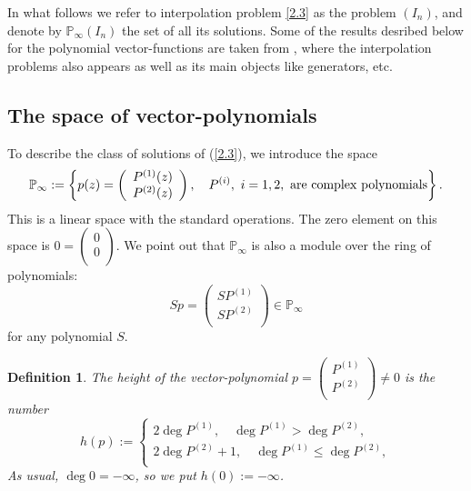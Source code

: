 \documentclass{amsart}
\newtheorem{definition}[theorem]{Definition}
\begin{document}
In what follows we refer to interpolation problem \eqref{2.3} as the
problem $(I_n)$, and denote by ${{\mathbb P}}_\infty(I_n)$ the set of all its
solutions. Some of the results desribed below for the polynomial
vector-functions are taken from \cite{Kud1}, \cite{Kud2} where the
interpolation problems also appears as well as its main objects like
generators, etc.

\subsection{The space of vector-polynomials}

To describe the class of solutions of (\ref{2.3}), we introduce the
space
$$ \mathbb{P}_\infty := \left\{ p(z) =
\left(\begin{array}{c} P^{(1)}(z) \\ P^{(2)}(z)\\
\end{array}\right), \quad  P^{(i)}, \ i=1,2, \ {\rm
are \ complex \ polynomials}  \right\}.
$$
This is a linear space with the standard operations. The zero
element on
this space is $0 =\left(\begin{array}{c} 0 \\ 0 \\
\end{array}\right)$. We point out that ${{\mathbb P}}_\infty$ is also a module over
the ring of polynomials:
$$ Sp=\left(\begin{array}{c} SP^{(1)} \\ SP^{(2)}\\
\end{array}\right)\in {{\mathbb P}}_\infty $$
for any polynomial $S$.

\begin{definition}\label{def1}
The height of the vector-polynomial $p =
\left(\begin{array}{c} P^{(1)} \\ P^{(2)}\\
\end{array}\right) \ne 0$ is the number
\begin{equation} \label{2.5}
h(p) := \left\{ \begin{array}{l} 2 \deg P^{(1)}, \quad \deg P^{(1)}
> \deg P^{(2)},\\
2 \deg P^{(2)} + 1, \quad \deg P^{(1)}
\leq \deg P^{(2)},\\
\end{array}
\right.
\end{equation}
As usual, $\deg 0=-\infty$, so we put $h(0):= -\infty$.
\end{definition}
\end{document}
